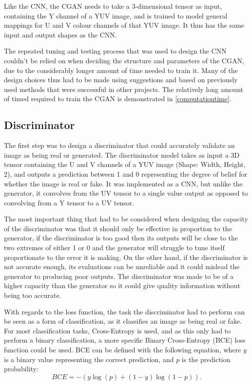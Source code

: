\documentclass{l4proj}
\begin{document}
Like the CNN, the CGAN needs to take a 3-dimensional tensor as input, containing the Y channel of a YUV image, and is trained to model general mappings for U and V colour channels of that YUV image. It thus has the same input and output shapes as the CNN.

The repeated tuning and testing process that was used to design the CNN couldn't be relied on when deciding the structure and parameters of the CGAN, due to the considerably longer amount of time needed to train it. Many of the design choices thus had to be made using suggestions and based on previously used methods that were successful in other projects. The relatively long amount of timed required to train the CGAN is demonstrated in \ref{computationtime}.

\subsection{Discriminator}
The first step was to design a discriminator that could accurately validate an image as being real or generated. The discriminator model takes as input a 3D tensor containing the U and V channels of a YUV image (Shape: Width, Height, 2), and outputs a prediction between 1 and 0 representing the degree of belief for whether the image is real or fake. It was implemented as a CNN, but unlike the generator, it convolves from the UV tensor to a single value output as opposed to convolving from a Y tensor to a UV tensor. 

The most important thing that had to be considered when designing the capacity of the discriminator was that it should only be effective in proportion to the generator, if the discriminator is too good then its outputs will be close to the two extremes of either 1 or 0 and the generator will struggle to tune itself proportionate to the error it is making. On the other hand, if the discriminator is not accurate enough, its evaluations can be unreliable and it could mislead the generator to producing poor outputs. The discriminator was made to be of a higher capacity than the generator so it could give quality information without being too accurate. 

With regards to the loss function, the task the discriminator had to perform can be seen as a form of classification, as it classifies an image as being real or fake. For most classification tasks, Cross-Entropy is used, and as this only had to perform a binary classification, a more specific Binary Cross-Entropy (BCE) loss function could be used. BCE can be defined with the following equation, where $y$ is a binary value representing the correct prediction, and $p$ is the prediction probability:
\begin{equation}
    BCE = -\left(y\log(p) + (1 - y)\log(1 - p)\right).
\end{equation}
\end{document}
